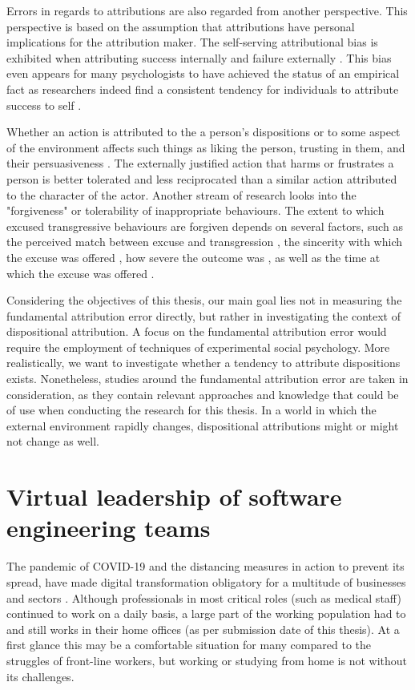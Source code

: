 Errors in regards to attributions are also regarded from another perspective. This perspective is based on the assumption that attributions have personal implications for the attribution maker. The self-serving attributional bias is exhibited when attributing success internally and failure externally \cite{Duval2002}.  This bias even appears for many psychologists to have achieved the status of an empirical fact \cite{Brown1991} as researchers indeed find a consistent tendency for individuals to attribute success to self \cite{Miller1975}.

Whether an action is attributed to the a person's dispositions or to some aspect of the
environment affects such things as liking the person,  trusting in them,  and their
persuasiveness \cite{Kelley1980}. The externally justified action that harms or frustrates a person is better tolerated and less reciprocated than a similar action attributed to the character of the actor.  Another stream of research looks into the "forgiveness" or tolerability of inappropriate behaviours. The extent to which excused transgressive behaviours are forgiven depends on several factors, such as the perceived match between excuse and transgression \cite{Kim2006}, the sincerity with which the excuse was offered \cite{Zechmeister2004},  how severe the outcome was \cite{Bennett1994},  as well as the time at which the excuse was offered \cite{Frantz2005}.

Considering the objectives of this thesis, our main goal lies not in measuring the fundamental attribution error directly, but rather in investigating the context of dispositional attribution. A focus on the fundamental attribution error would require the employment of techniques of experimental social psychology. More realistically, we want to investigate whether a tendency to attribute dispositions exists. Nonetheless, studies around the fundamental attribution error are taken in consideration, as they contain relevant approaches and knowledge that could be of use when conducting the research for this thesis.  In a world in which the external environment rapidly changes, dispositional attributions might or might not change as well. 

\section{Virtual leadership of software engineering teams} \label{VirtualLeadership}

The pandemic of COVID-19 and the distancing measures in action to prevent its spread, have made digital transformation obligatory for a multitude of businesses and sectors \cite{Fletcher2020}.  Although professionals in most critical roles (such as medical staff) continued to work on a daily basis,  a large part of the working population had to and still works in their home offices (as per submission date of this thesis).  At a first glance this may be a comfortable situation for many compared to the struggles of front-line workers,  but working or studying from home is not without its challenges.  

